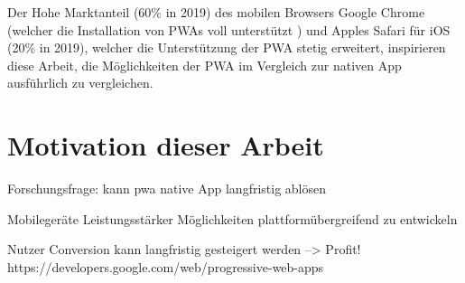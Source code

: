 Der Hohe Marktanteil (60\% in 2019) des mobilen Browsers Google Chrome (welcher die Installation von PWAs voll unterstützt \cite[S. 8]{BeginningPWA}) und Apples Safari für iOS (20\% in 2019), welcher die Unterstützung der PWA stetig erweitert, inspirieren diese Arbeit, die Möglichkeiten der PWA im Vergleich zur nativen App ausführlich zu vergleichen.
\cite{StatistaMobileBrowserMarketShare}








\section{Motivation dieser Arbeit}
Forschungsfrage: kann \ac{pwa} native App langfristig ablösen

Mobilegeräte Leistungsstärker
Möglichkeiten plattformübergreifend zu entwickeln

Nutzer Conversion kann langfristig gesteigert werden --> Profit!\\
https://developers.google.com/web/progressive-web-apps
\cite{GooglePWAOverview}



